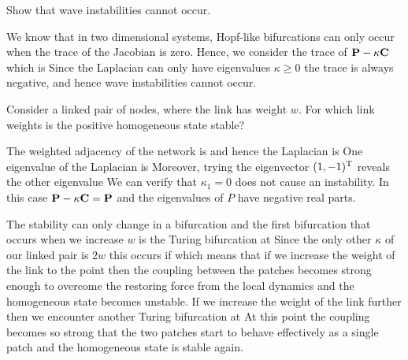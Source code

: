 \subquestion 
Show that wave instabilities cannot occur. 

\solution
We know that in two dimensional systems, Hopf-like bifurcations can only occur when the trace of the Jacobian is zero. Hence, we consider the trace of ${\bf P} - \kappa {\bf C}$ which is 
Since the Laplacian can only have eigenvalues $\kappa\geq 0$ the trace is always negative, and hence wave instabilities cannot occur. 

\subquestion 
Consider a linked pair of nodes, where the link has weight $w$. For which link weights is the positive homogeneous state stable?

\solution 
The weighted adjacency of the network is 
and hence the Laplacian is 
One eigenvalue of the Laplacian is 
Moreover, trying the eigenvector $(1,-1)^{\rm T}$ reveals the other eigenvalue 
We can verify that $\kappa_1=0$ does not cause an instability. In this case ${\bf P}-\kappa{\bf C}={\bf P}$ and the eigenvalues of $P$ have negative real parts. 

The stability can only change in a bifurcation and the first bifurcation that occurs when we increase $w$ is the Turing bifurcation at
Since the only other $\kappa$ of our linked pair is $2w$ this occurs if  
which means that if we increase the weight of the link to the point 
then the coupling between the patches becomes strong enough to overcome the restoring force from the local dynamics and the homogeneous state becomes unstable. If we increase the weight of the link further then 
we encounter another Turing bifurcation 
at
At this point the coupling becomes so strong that the two patches start to behave effectively as a single patch and the homogeneous state is stable again. 
